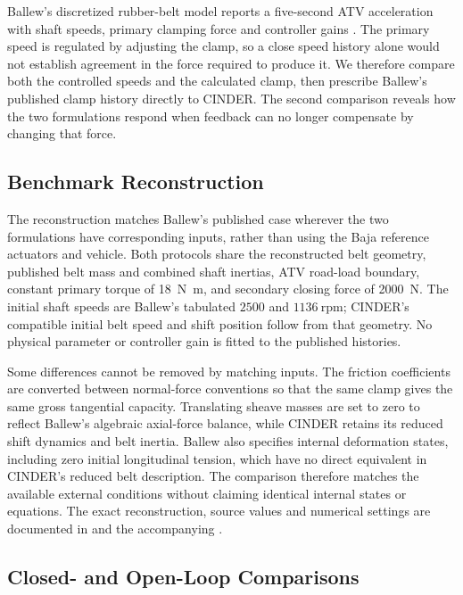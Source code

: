 \documentclass[11pt]{report}
\numberwithin{equation}{section}
\begin{document}
Ballew's discretized rubber-belt model reports a five-second ATV
acceleration with shaft speeds, primary clamping force and controller
gains \citep{Ballew2015}. The primary speed is regulated by adjusting
the clamp, so a close speed history alone would not establish agreement
in the force required to produce it. We therefore compare both the
controlled speeds and the calculated clamp, then prescribe Ballew's
published clamp history directly to CINDER. The second comparison
reveals how the two formulations respond when feedback can no longer
compensate by changing that force.

\subsection{Benchmark Reconstruction}
\label{sec:results_ballew_reconstruction}

The reconstruction matches Ballew's published case wherever the two
formulations have corresponding inputs, rather than using the Baja
reference actuators and vehicle. Both protocols share the reconstructed
belt geometry, published belt mass and combined shaft inertias, ATV
road-load boundary, constant primary torque of \SI{18}{N.m}, and
secondary closing force of \SI{2000}{N}. The initial shaft speeds
are Ballew's tabulated \(2500\) and \(1136~\mathrm{rpm}\); CINDER's
compatible initial belt speed and shift position follow from that
geometry. No physical parameter or controller gain is fitted to the
published histories.

Some differences cannot be removed by matching inputs. The friction
coefficients are converted between normal-force conventions so that
the same clamp gives the same gross tangential capacity. Translating
sheave masses are set to zero to reflect Ballew's algebraic
axial-force balance, while CINDER retains its reduced shift dynamics
and belt inertia. Ballew also specifies internal deformation states,
including zero initial longitudinal tension, which have no direct
equivalent in CINDER's reduced belt description. The comparison
therefore matches the available external conditions without claiming
identical internal states or equations. The exact reconstruction,
source values and numerical settings are documented in
 and the accompanying
.

\subsection{Closed- and Open-Loop Comparisons}
\label{sec:results_ballew_closed_loop}
\label{sec:results_ballew_force_replay}
\end{document}
